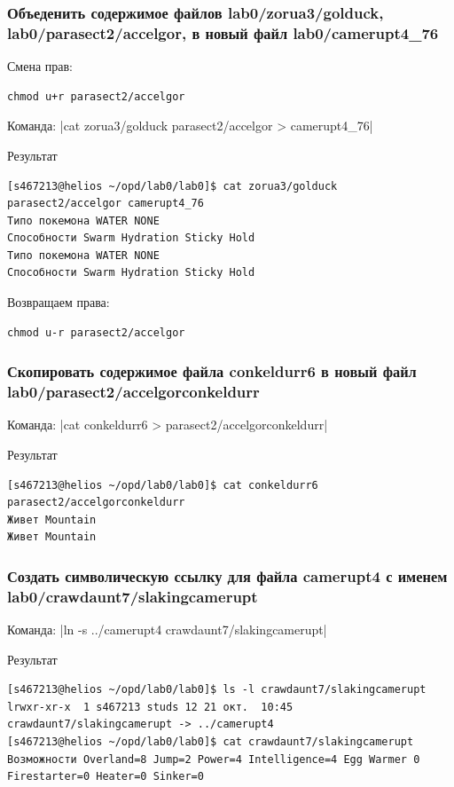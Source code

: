 \subsubsection*{Объеденить содержимое файлов lab0/zorua3/golduck, lab0/parasect2/accelgor, в новый файл lab0/camerupt4\_76}

Смена прав: 
\begin{verbatim}
chmod u+r parasect2/accelgor
\end{verbatim}

Команда: |cat zorua3/golduck parasect2/accelgor > camerupt4_76|

Результат
\begin{verbatim}
[s467213@helios ~/opd/lab0/lab0]$ cat zorua3/golduck parasect2/accelgor camerupt4_76
Типо покемона WATER NONE
Способности Swarm Hydration Sticky Hold
Типо покемона WATER NONE
Способности Swarm Hydration Sticky Hold
\end{verbatim}

Возвращаем права:
\begin{verbatim}
chmod u-r parasect2/accelgor
\end{verbatim}


\subsubsection*{Скопировать содержимое файла conkeldurr6 в новый файл lab0/parasect2/accelgorconkeldurr}
Команда: |cat conkeldurr6 > parasect2/accelgorconkeldurr|

Результат
\begin{verbatim}
[s467213@helios ~/opd/lab0/lab0]$ cat conkeldurr6 parasect2/accelgorconkeldurr
Живет Mountain
Живет Mountain
\end{verbatim}

\subsubsection*{Создать символическую ссылку для файла camerupt4 с именем lab0/crawdaunt7/slakingcamerupt}
Команда: |ln -s ../camerupt4 crawdaunt7/slakingcamerupt|

Результат
\begin{verbatim}
[s467213@helios ~/opd/lab0/lab0]$ ls -l crawdaunt7/slakingcamerupt
lrwxr-xr-x  1 s467213 studs 12 21 окт.  10:45 crawdaunt7/slakingcamerupt -> ../camerupt4
[s467213@helios ~/opd/lab0/lab0]$ cat crawdaunt7/slakingcamerupt
Возможности Overland=8 Jump=2 Power=4 Intelligence=4 Egg Warmer 0 Firestarter=0 Heater=0 Sinker=0
\end{verbatim}
